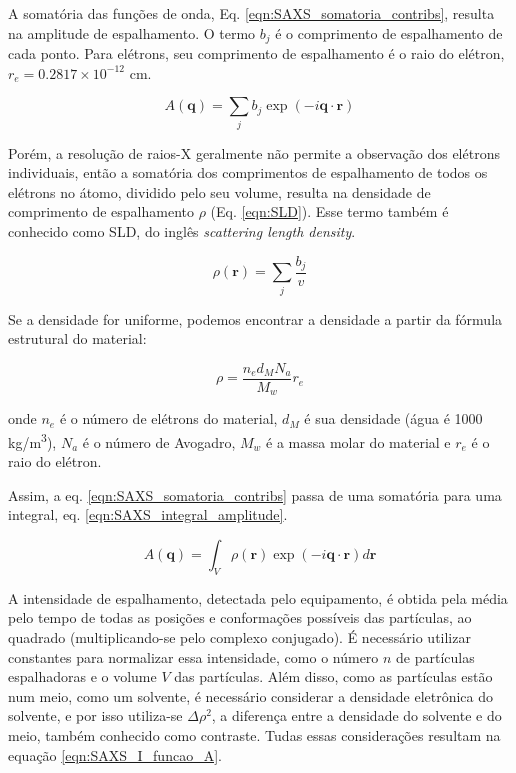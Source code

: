 		A somatória das funções de onda, Eq. \ref{eqn:SAXS_somatoria_contribs}, resulta na amplitude de espalhamento. O termo \(b_j\) é o comprimento de espalhamento de cada ponto. Para elétrons, seu comprimento de espalhamento é o raio do elétron, \(r_e = 0.2817 \times 10^{-12}\) cm.
		
		\begin{equation}
			A(\mathbf{q}) = \sum_j b_j \exp(-i \mathbf{q} \cdot \mathbf{r})
			\label{eqn:SAXS_somatoria_contribs}
		\end{equation}
		
		Porém, a resolução de raios-X geralmente não permite a observação dos elétrons individuais, então a somatória dos comprimentos de espalhamento de todos os elétrons no átomo, dividido pelo seu volume, resulta na densidade de comprimento de espalhamento \(\rho\) (Eq. \ref{eqn:SLD}). Esse termo também é conhecido como SLD, do inglês \emph{scattering length density}.
		
		\begin{equation}
			\rho(\mathbf{r}) = \sum_j \dfrac{b_j}{v}
			\label{eqn:SLD}
		\end{equation}
		
		Se a densidade for uniforme, podemos encontrar a densidade a partir da fórmula estrutural do material:
		
		\begin{equation}
			\rho = \dfrac{n_e d_M N_a}{M_w} r_e
			\label{eqn:rho_uniforme}
		\end{equation}
		
		\noindent onde \(n_e\) é o número de elétrons do material, \(d_M\) é sua densidade (água é 1000 kg/m\textsuperscript{3}), \(N_a\) é o número de Avogadro, \(M_w\) é a massa molar do material e \(r_e\) é o raio do elétron.
		
		Assim, a eq. \ref{eqn:SAXS_somatoria_contribs} passa de uma somatória para uma integral, eq. \ref{eqn:SAXS_integral_amplitude}.
		
		\begin{equation}
			A(\mathbf{q}) = \int_V \rho(\mathbf{r}) \exp(-i \mathbf{q} \cdot \mathbf{r}) d\mathbf{r}
			\label{eqn:SAXS_integral_amplitude}
		\end{equation}
		
		A intensidade de espalhamento, detectada pelo equipamento, é obtida pela média pelo tempo de todas as posições e conformações possíveis das partículas, ao quadrado (multiplicando-se pelo complexo conjugado). É necessário utilizar constantes para normalizar essa intensidade, como o número \(n\) de partículas espalhadoras e o volume \(V\) das partículas. Além disso, como as partículas estão num meio, como um solvente, é necessário considerar a densidade eletrônica do solvente, e por isso utiliza-se \(\Delta \rho^2\), a diferença entre a densidade do solvente e do meio, também conhecido como contraste. Tudas essas considerações resultam na equação \ref{eqn:SAXS_I_funcao_A}.
		
